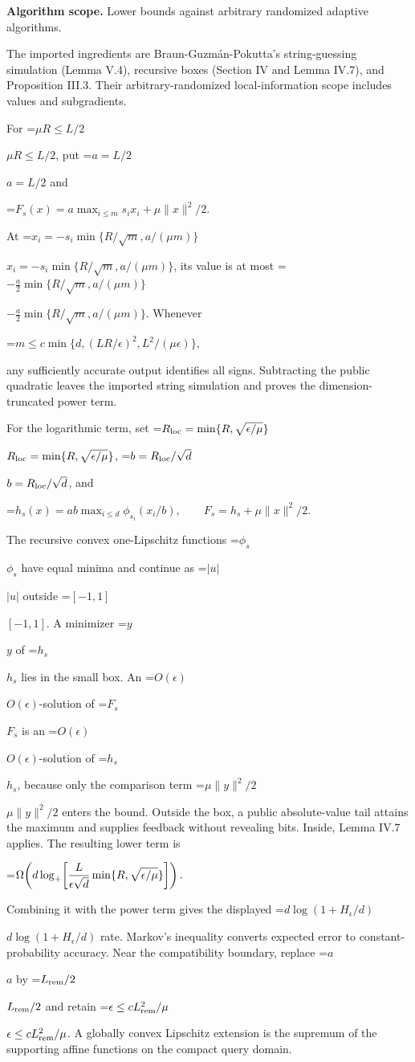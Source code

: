 \documentclass[10pt,a4paper]{article}
\newcommand{\AtlasMath}[1]{\par\begingroup\centering\setbox0=\hbox{$\displaystyle #1$}\ifdim\wd0>1.4\linewidth\typeout{ATLAS WIDE FORMULA: \the\wd0}\fi\ifdim\wd0>\linewidth\resizebox{\linewidth}{!}{\box0}\else\box0\fi\par\endgroup}
\newcommand{\AtlasInlineMath}[1]{\begingroup\setbox0=\hbox{$#1$}\ifdim\wd0>.4\linewidth\endgroup\AtlasMath{#1}\else\endgroup$#1$\fi}
\begin{document}
\textbf{Algorithm scope.} Lower bounds against arbitrary randomized adaptive algorithms.

The imported ingredients are Braun-Guzmán-Pokutta's string-guessing simulation (Lemma V.4), recursive boxes (Section IV and Lemma IV.7), and Proposition III.3. Their arbitrary-randomized local-information scope includes values and subgradients.

For \AtlasInlineMath{\mu R\le L/2}, put \AtlasInlineMath{a=L/2} and

\AtlasMath{F_s(x)=a\max_{i\le m}s_ix_i+\mu\|x\|^2/2.}

At \AtlasInlineMath{x_i=-s_i\min\{R/\sqrt m,a/(\mu m)\}}, its value is at most
\AtlasInlineMath{-\tfrac a2\min\{R/\sqrt m,a/(\mu m)\}}.
Whenever


\AtlasMath{m\le c\min\{d,(LR/\epsilon)^2,L^2/(\mu\epsilon)\},}


any sufficiently accurate output identifies all signs. Subtracting the public quadratic leaves the imported string simulation and proves the dimension-truncated power term.

For the logarithmic term, set \AtlasInlineMath{R_{\rm loc}=\min\{R,\sqrt{\epsilon/\mu}\}}, \AtlasInlineMath{b=R_{\rm loc}/\sqrt d}, and

\AtlasMath{h_s(x)=ab\max_{i\le d}\phi_{s_i}(x_i/b),\qquad
F_s=h_s+\mu\|x\|^2/2.}

The recursive convex one-Lipschitz functions \AtlasInlineMath{\phi_s} have equal minima and continue as \AtlasInlineMath{|u|} outside \AtlasInlineMath{[-1,1]}. A minimizer \AtlasInlineMath{y} of \AtlasInlineMath{h_s} lies in the small box. An \AtlasInlineMath{O(\epsilon)}-solution of \AtlasInlineMath{F_s} is an \AtlasInlineMath{O(\epsilon)}-solution of \AtlasInlineMath{h_s}, because only the comparison term \AtlasInlineMath{\mu\|y\|^2/2} enters the bound. Outside the box, a public absolute-value tail attains the maximum and supplies feedback without revealing bits. Inside, Lemma IV.7 applies. The resulting lower term is

\AtlasMath{\Omega\!\left(d\log_+\!\left[{L\over\epsilon\sqrt d}
\min\{R,\sqrt{\epsilon/\mu}\}\right]\right).}

Combining it with the power term gives the displayed \AtlasInlineMath{d\log(1+H_\epsilon/d)} rate. Markov's inequality converts expected error to constant-probability accuracy. Near the compatibility boundary, replace \AtlasInlineMath{a} by \AtlasInlineMath{L_{\rm rem}/2} and retain \AtlasInlineMath{\epsilon\le cL_{\rm rem}^2/\mu}. A globally convex Lipschitz extension is the supremum of the supporting affine functions on the compact query domain.
\end{document}
